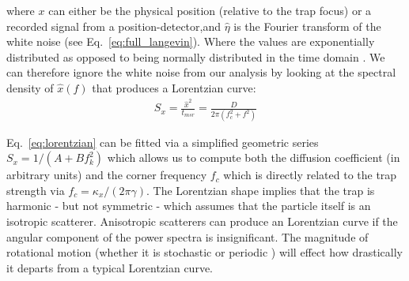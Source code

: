 where $x$ can either be the physical position (relative to the trap
focus) or a recorded signal from a position-detector,and $\hat{\eta}$ 
is the Fourier transform of the white noise (see Eq.~\eqref{eq:full_langevin}). Where the values are exponentially distributed as opposed to being 
normally distributed in the time domain \cite{BergSoerensen2004}.
We can therefore ignore the white noise from our analysis by looking 
at the spectral density of $\hat{x}(f)$ that produces a Lorentzian
curve: 
\begin{align}
	\label{eq:lorentzian}
	S_x = \frac{\hat{x}^2}{t_{msr}} = \frac{D}{2\pi(f_c^2+f^2)}
\end{align}
 

Eq.~\eqref{eq:lorentzian} can be fitted via a simplified geometric 
series $S_x = 1/(A+Bf_k^2)$ which allows us to compute both the 
diffusion coefficient (in arbitrary units) and the corner frequency 
$f_c$ which is directly related to the trap strength via $f_c = \kappa_x/(2\pi\gamma)$. The Lorentzian shape implies that the trap 
is harmonic - but not symmetric - which assumes that the particle 
itself is an isotropic scatterer. Anisotropic scatterers can 
produce an Lorentzian curve if the angular component of the power
spectra is insignificant. The magnitude of rotational motion 
(whether it is stochastic \cite{Bang2020} or periodic 
\cite{Yogesha2012}) will effect how drastically it departs from a 
typical Lorentzian curve.

